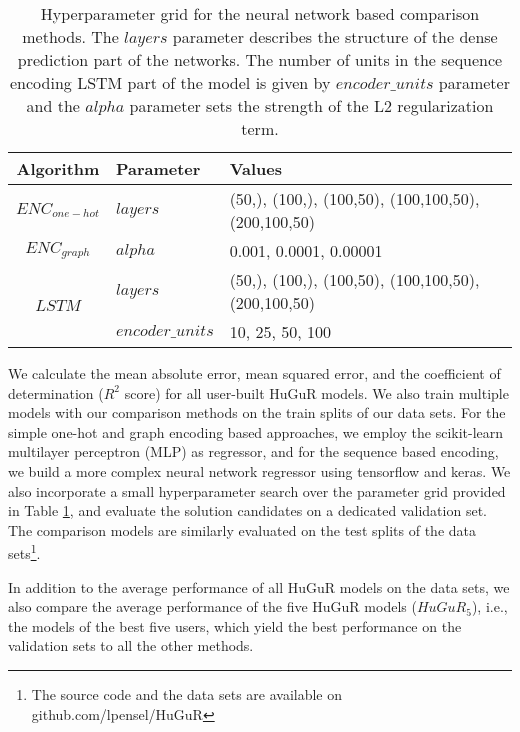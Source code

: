 \begin{table}[]
    \centering
    \caption{Hyperparameter grid for the neural network based comparison methods. The $layers$ parameter describes the structure of the dense prediction part of the networks. The number of units in the sequence encoding LSTM part of the model is given by $encoder\_units$ parameter and the $alpha$ parameter sets the strength of the L2 regularization term.}
    \label{tab:hyperparams}
    \begin{tabular}{c|ll}
    \toprule
        Algorithm & Parameter & Values \\
        \midrule
        $ENC_{one-hot}$ & $layers$ & (50,), (100,), (100,50), (100,100,50), (200,100,50) \\
        $ENC_{graph}$ & $alpha$ & 0.001, 0.0001, 0.00001 \\
        \hline
        \multirow{ 2}{*}{$LSTM$} & $layers$ & (50,), (100,), (100,50), (100,100,50), (200,100,50) \\
        & $encoder\_units$ & 10, 25, 50, 100\\
        \bottomrule
    \end{tabular}
    
    
\end{table}

We calculate the mean absolute error, mean squared error, and the coefficient of determination ($R^2$ score) for all user-built HuGuR models. We also train multiple models with our comparison methods on the train splits of our data sets. For the simple one-hot and graph encoding based approaches, we employ the scikit-learn \cite{scikit-learn} multilayer perceptron (MLP) as regressor, and for the sequence based encoding,  we build a more complex neural network regressor using tensorflow \cite{tensorflow} and keras. We also incorporate a small hyperparameter search over the parameter grid provided in Table \ref{tab:hyperparams}, and evaluate the solution candidates on a dedicated validation set. The comparison models are similarly evaluated on the test splits of the data sets\footnote{The source code and the data sets are available on github.com/lpensel/HuGuR}. 

In addition to the average performance of all HuGuR models on the data sets, we also compare the average performance of the five HuGuR models ($HuGuR_5$), i.e., the models of the best five users, which yield the best performance on the validation sets to all the other methods.

